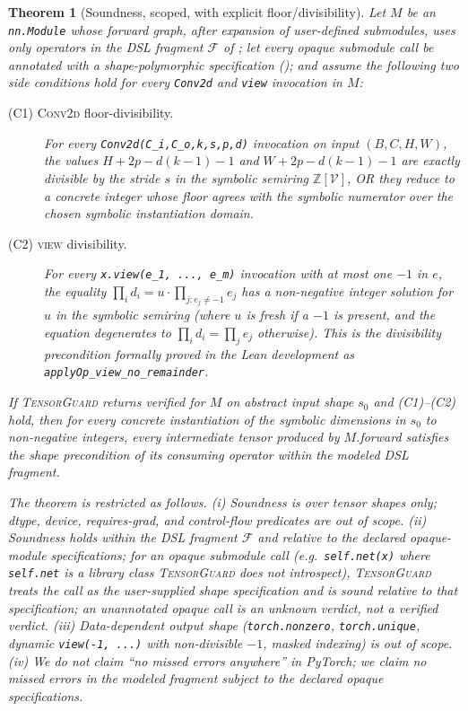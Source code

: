 \documentclass{article}
\newtheorem{theorem}{Theorem}
\theoremstyle{definition}
\begin{document}
\begin{theorem}[Soundness, scoped, with explicit floor/divisibility]
\label{thm:soundness}
Let $M$ be an \verb|nn.Module| whose forward graph, after expansion
of user-defined submodules, uses only operators in the DSL fragment
$\mathcal F$ of ; let every opaque submodule
call be annotated with a shape-polymorphic specification
(); and assume the following two side conditions
hold for every \verb|Conv2d| and \verb|view| invocation in $M$:

\begin{description}
\item[(C1) \textsc{Conv2d} floor-divisibility.] For every
  \verb|Conv2d(C_i,C_o,k,s,p,d)| invocation on input
  $(B,C,H,W)$, the values $H+2p-d(k-1)-1$ and $W+2p-d(k-1)-1$ are
  exactly divisible by the stride $s$ in the symbolic semiring
  $\mathbb Z[\mathcal V]$, OR they reduce to a concrete integer
  whose floor agrees with the symbolic numerator over the chosen
  symbolic instantiation domain.
\item[(C2) \textsc{view} divisibility.] For every
  \verb|x.view(e_1, ..., e_m)| invocation with at most one $-1$ in
  $e$, the equality
  $\prod_i d_i = u\!\cdot\!\prod_{j: e_j \neq -1} e_j$
  has a non-negative integer solution for $u$ in the symbolic
  semiring (where $u$ is fresh if a $-1$ is present, and the
  equation degenerates to $\prod_i d_i = \prod_j e_j$ otherwise).
  This is the divisibility precondition formally proved in the Lean
  development as \texttt{applyOp\_view\_no\_remainder}.
\end{description}

If \textsc{TensorGuard} returns \textsf{verified} for $M$ on
abstract input shape $s_0$ \emph{and} (C1)--(C2) hold, then for
every concrete instantiation of the symbolic dimensions in $s_0$
to non-negative integers, every intermediate tensor produced by
$M$.\textit{forward} satisfies the \emph{shape} precondition of
its consuming operator within the modeled DSL fragment.

The theorem is restricted as follows. (i) Soundness is over
\emph{tensor shapes only}; dtype, device, requires-grad, and
control-flow predicates are out of scope. (ii) Soundness holds
\emph{within the DSL fragment $\mathcal F$ and relative to the
declared opaque-module specifications}; for an opaque submodule
call (e.g.\ \verb|self.net(x)| where \verb|self.net| is a library
class \textsc{TensorGuard} does not introspect),
\textsc{TensorGuard} treats the call as the user-supplied shape
specification and is sound \emph{relative to} that specification;
an unannotated opaque call is an \textsf{unknown} verdict, not a
\textsf{verified} verdict. (iii) Data-dependent output shape
(\verb|torch.nonzero|, \verb|torch.unique|, dynamic
\verb|view(-1, ...)| with non-divisible $-1$, masked indexing) is
out of scope. (iv) We do \emph{not} claim ``no missed errors
anywhere'' in PyTorch; we claim no missed errors in the modeled
fragment subject to the declared opaque specifications.
\end{theorem}
\end{document}
